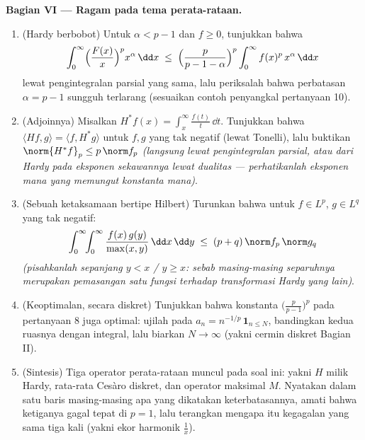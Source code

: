 \begin{problem}
\medskip
\noindent\textbf{Bagian VI --- Ragam pada tema
perata-rataan.}
\begin{enumerate}[resume]
  \item (Hardy berbobot) Untuk $\alpha < p - 1$ dan $f \geq 0$,
        tunjukkan bahwa
        \[
        \int_0^\infty\Bigl(\frac{F(x)}x\Bigr)^{p}
        x^{\alpha}\,\dd x \;\leq\;
        \Bigl(\frac{p}{p - 1 - \alpha}\Bigr)^{p}
        \int_0^\infty f(x)^p\,x^{\alpha}\,\dd x
        \]
        lewat pengintegralan parsial yang sama, lalu periksalah bahwa
        perbatasan $\alpha = p - 1$ sungguh terlarang
        (sesuaikan contoh penyangkal pertanyaan 10).
  \item (Adjoinnya) Misalkan $H^*f(x) =
        \int_x^{\infty}\frac{f(t)}t\,\dd t$. Tunjukkan bahwa $\langle
        Hf, g\rangle = \langle f, H^*g\rangle$ untuk
        $f, g$ yang tak negatif (lewat Tonelli), lalu buktikan
        $\norm{H^*f}_p \leq p\,\norm f_p$ \emph{(langsung lewat
        pengintegralan parsial, atau dari Hardy pada eksponen sekawannya lewat
        dualitas --- perhatikanlah eksponen mana yang memungut konstanta mana)}.
  \item (Sebuah ketaksamaan bertipe Hilbert) Turunkan bahwa untuk
        $f \in L^p$, $g \in L^q$ yang tak negatif:
        \[
        \int_0^\infty\!\!\int_0^\infty
        \frac{f(x)\,g(y)}{\max(x,y)}\,\dd x\,\dd y
        \;\leq\; (p + q)\,\norm f_p\,\norm g_q
        \]
        \emph{(pisahkanlah sepanjang $y < x$ / $y \geq x$: sebab masing-masing separuhnya
        merupakan pemasangan satu fungsi terhadap transformasi Hardy
        yang lain)}.
  \item (Keoptimalan, secara diskret) Tunjukkan bahwa konstanta
        $\bigl(\frac p{p-1}\bigr)^p$ pada pertanyaan 8 juga
        optimal: ujilah pada $a_n = n^{-1/p}\,\mathbf 1_{n \leq
        N}$, bandingkan kedua ruasnya dengan integral, lalu biarkan $N
        \to \infty$ (yakni cermin diskret Bagian II).
  \item (Sintesis) Tiga operator perata-rataan muncul pada
        soal ini: yakni $H$ milik Hardy, rata-rata Cesàro
        diskret, dan operator maksimal $M$. Nyatakan dalam satu
        baris masing-masing apa yang dikatakan keterbatasannya, amati bahwa ketiganya
        gagal tepat di $p = 1$, lalu terangkan mengapa itu
        kegagalan yang sama tiga kali (yakni ekor harmonik
        $\frac1x$).
\end{enumerate}


\end{problem}
